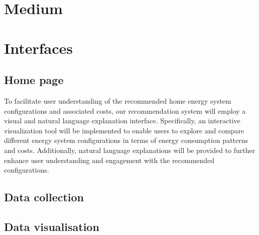 \section{Medium}


\section{Interfaces}

\subsection{Home page}

To facilitate user understanding of the recommended home energy system configurations and associated costs, our recommendation system will employ a visual and natural language explanation interface. 
Specifically, an interactive visualization tool will be implemented to enable users to explore and compare different energy system configurations in terms of energy consumption patterns and costs. 
Additionally, natural language explanations will be provided to further enhance user understanding and engagement with the recommended configurations. 

\subsection{Data collection}

\subsection{Data visualisation}


